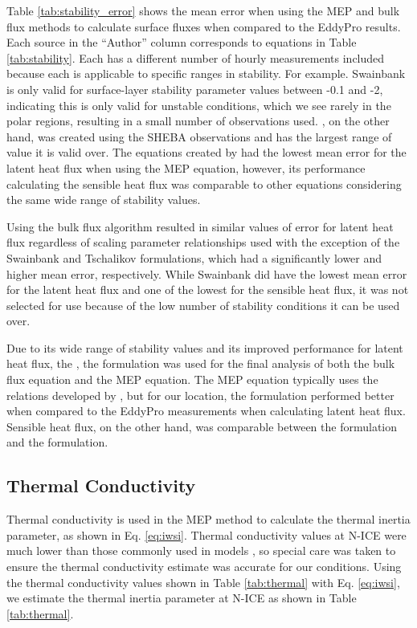 Table \ref{tab:stability_error} shows the mean error when using the MEP and bulk flux methods to calculate surface fluxes when compared to the EddyPro results. Each source in the ``Author'' column corresponds to equations in Table \ref{tab:stability}. Each has a different number of hourly measurements included because each is applicable to specific ranges in stability. For example. Swainbank \citep{foken:2008} is only valid for surface-layer stability parameter values between -0.1 and -2, indicating this is only valid for unstable conditions, which we see rarely in the polar regions, resulting in a small number of observations used. \citet{andreas:311}, on the other hand, was created using the SHEBA observations and has the largest range of value it is valid over. The equations created by \citet{andreas:311} had the lowest mean error for the latent heat flux when using the MEP equation, however, its performance calculating the sensible heat flux was comparable to other equations considering the same wide range of stability values. 

Using the bulk flux algorithm resulted in similar values of error for latent heat flux regardless of scaling parameter relationships used with the exception of the Swainbank and Tschalikov \citep{foken:2008} formulations, which had a significantly lower and higher mean error, respectively. While Swainbank \citep{foken:2008} did have the lowest mean error for the latent heat flux and one of the lowest for the sensible heat flux, it was not selected for use because of the low number of stability conditions it can be used over.  

Due to its wide range of stability values and its improved performance for latent heat flux, the \citet{andreas:2010}, the formulation was used for the final analysis of both the bulk flux equation and the MEP equation. The MEP equation typically uses the relations developed by \citet{businger:1971}, but for our location, the \citet{andreas:311} formulation performed better when compared to the EddyPro measurements when calculating latent heat flux. Sensible heat flux, on the other hand, was comparable between the  \citet{andreas:311} formulation and the \citet{businger:1971} formulation. 


\subsection{Thermal Conductivity}
Thermal conductivity is used in the MEP method to calculate the thermal inertia parameter, as shown in Eq. \ref{eq:iwsi}. Thermal conductivity values at N-ICE were much lower than those commonly used in models \citep{merkouriadi:2017}, so special care was taken to ensure the thermal conductivity estimate was accurate for our conditions. Using the thermal conductivity values shown in Table \ref{tab:thermal} with Eq. \ref{eq:iwsi}, we estimate the thermal inertia parameter at N-ICE as shown in  Table \ref{tab:thermal}. 

